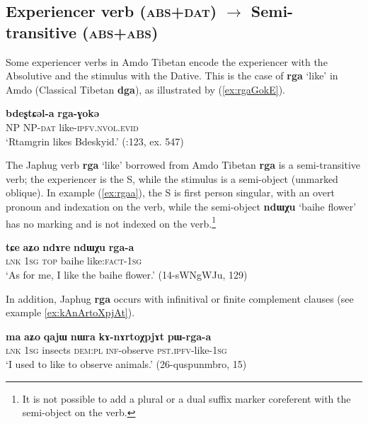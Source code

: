 \documentclass[oneside,a4paper,11pt]{article}
\newcommand{\ipa}[1]{{\phon\textbf{\mbox{#1}}}} %
\newcommand{\refb}[1]{(\ref{#1})}
\begin{document}
\subsection{Experiencer verb (\textsc{abs+dat}) $\rightarrow$ Semi-transitive (\textsc{abs+abs})}
Some experiencer verbs in Amdo Tibetan encode the experiencer with the Absolutive and the stimulus with the Dative. This is the case of \ipa{rga} `like' in Amdo (Classical Tibetan \ipa{dga}), as illustrated by \refb{ex:rgaGokE}.

\begin{exe}
\ex \label{ex:rgaGokE}
\gll \ipa{ʂtamɖʐən}  \ipa{bdeʂtɕəl-a}  \ipa{rga-ɣokə} \\
NP NP-\textsc{dat} like-\textsc{ipfv.nvol.evid} \\
\glt `Rtamgrin likes Bdeskyid.' (\citealt{haller04themchen}:123, ex. 547)
\end{exe}

The Japhug verb \ipa{rga} `like' borrowed from Amdo Tibetan \ipa{rga} is a semi-transitive verb; the experiencer is the S, while the stimulus is a semi-object (unmarked oblique). In example \refb{ex:rgaa}, the S is first person singular,  with an overt pronoun and indexation on the verb, while the semi-object \ipa{ndɯχu} `baihe flower' has no marking and is not indexed on the verb.\footnote{It is not possible to add a plural or a dual suffix marker coreferent with the semi-object on the verb.}  

\begin{exe}
\ex \label{ex:rgaa}
\gll
\ipa{tɕe} 	\ipa{aʑo} 	\ipa{ndɤre} 	\ipa{ndɯχu} 	\ipa{rga-a} \\
\textsc{lnk} \textsc{1sg} \textsc{top} baihe like:\textsc{fact}-\textsc{1sg} \\
\glt `As for me, I like the baihe flower.' (14-sWNgWJu, 129)
\end{exe}


In addition, Japhug \ipa{rga}  occurs with infinitival or finite complement clauses (see example \ref{ex:kAnArtoXpjAt}).

\begin{exe}
\ex \label{ex:kAnArtoXpjAt}
\gll  
\ipa{ma} 	\ipa{aʑo} 	\ipa{qajɯ} 	\ipa{nɯra} 	\ipa{kɤ-nɤrtoχpjɤt} 	\ipa{pɯ-rga-a} \\
\textsc{lnk} \textsc{1sg} insects \textsc{dem:pl} \textsc{inf}-observe \textsc{pst.ipfv}-like-\textsc{1sg} \\
\glt `I used to like to observe animals.' (26-quspunmbro, 15)
\end{exe}
\end{document}
